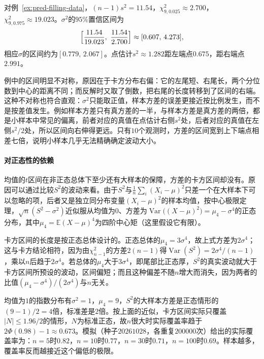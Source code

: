 \begin{example}[灌装量方差的区间]
\label{ex:pred-filling-variance-interval}
对例~\ref{ex:pred-filling-data}，$(n-1)s^2=11.54$，$\chi^2_{9,0.025}\approx2.700$，$\chi^2_{9,0.975}\approx19.023$。$\sigma^2$的$95\%$置信区间为
\[
 \Bigl[\frac{11.54}{19.023},\ \frac{11.54}{2.700}\Bigr]\approx[0.607,\,4.273],
\]
相应$\sigma$的区间约为$[0.779,\,2.067]$。点估计$s^2\approx1.282$距左端点$0.675$，距右端点$2.991$。
\end{example}

例中的区间明显不对称，原因在于卡方分布右偏：它的左尾短、右尾长，两个分位数到中心的距离不同；而反解时又取了倒数，把右尾的长度转移到了区间的右端。这种不对称也符合直观：$\sigma^2$只能取正值，样本方差的误差更接近按比例发生，而不是按差值发生。例如样本方差只有真方差的一半，与样本方差是真方差的两倍，都是小样本中常见的偏离，前者对应的真值在点估计右侧$s^2$处，后者对应的真值在左侧$s^2/2$处，所以区间向右伸得更远。只有$10$个观测时，方差的区间宽到上下端点相差七倍，说明小样本几乎无法精确确定波动大小。

\paragraph{对正态性的依赖}

均值的$t$区间在非正态总体下至少还有大样本的保障，方差的卡方区间却没有。原因可以通过比较$S^2$的波动来看。由于$S^2$与$\frac1n\sum_i(X_i-\mu)^2$只差一个在大样本下可以忽略的项，后者又是独立同分布变量$(X_i-\mu)^2$的样本均值，按中心极限定理，$\sqrt n(S^2-\sigma^2)$近似服从均值为$0$、方差为$\operatorname{Var}\bigl((X-\mu)^2\bigr)=\mu_4-\sigma^4$的正态分布，其中$\mu_4=\mathbb E(X-\mu)^4$为四阶中心矩（这里假设它有限）。

卡方区间的长度是按正态总体设计的。正态总体的$\mu_4=3\sigma^4$，故上式方差为$2\sigma^4$；这与卡方结论相符，因为由$\chi^2_{n-1}$的方差$2(n-1)$得$\operatorname{Var}(S^2)=2\sigma^4/(n-1)$，乘以$n$后趋于$2\sigma^4$。若总体的$\mu_4$大于$3\sigma^4$，即尾部比正态厚，$S^2$的真实波动就大于卡方区间所预设的波动，区间偏短；而且这种偏差不随$n$增大而消失，因为两者的比值$(\mu_4-\sigma^4)/(2\sigma^4)$与$n$无关。

\begin{example}[指数总体下的方差区间]
\label{ex:pred-variance-nonnormal}
均值为$1$的指数分布有$\sigma^2=1$，$\mu_4=9$，$S^2$的大样本方差是正态情形的$(9-1)/2=4$倍，标准差是$2$倍。按上面的近似，卡方区间实际只覆盖$|N|\leq1.96/2$的情形，$N$为标准正态，故$n$很大时实际覆盖率趋于$2\Phi(0.98)-1\approx0.673$。模拟（种子$20261028$，各重复$200000$次）给出的实际覆盖率为：$n=5$时$0.82$，$n=10$时$0.77$，$n=30$时$0.71$，$n=100$时$0.69$。样本越多，覆盖率反而越接近这个偏低的极限。
\end{example}

